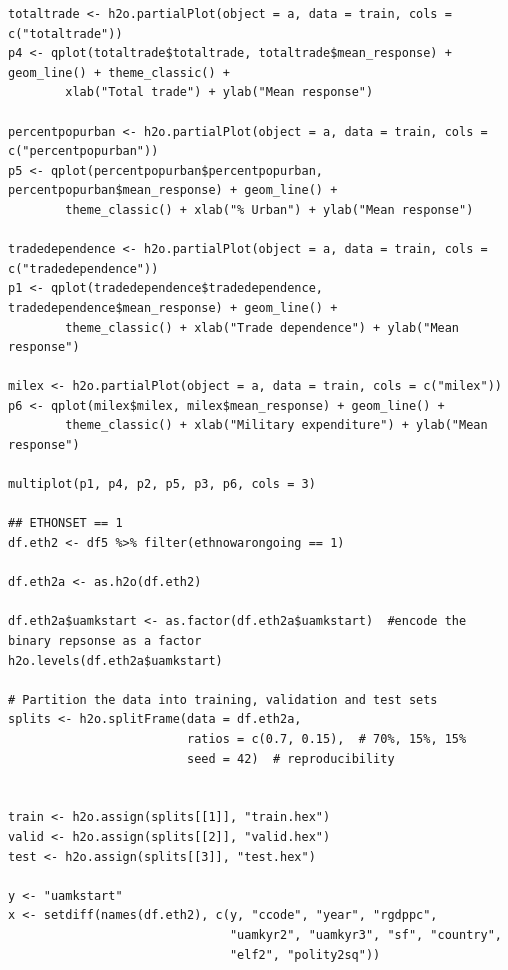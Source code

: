 \begin{verbatim}
totaltrade <- h2o.partialPlot(object = a, data = train, cols = c("totaltrade"))
p4 <- qplot(totaltrade$totaltrade, totaltrade$mean_response) + geom_line() + theme_classic() +
        xlab("Total trade") + ylab("Mean response")

percentpopurban <- h2o.partialPlot(object = a, data = train, cols = c("percentpopurban"))
p5 <- qplot(percentpopurban$percentpopurban, percentpopurban$mean_response) + geom_line() +
        theme_classic() + xlab("% Urban") + ylab("Mean response")

tradedependence <- h2o.partialPlot(object = a, data = train, cols = c("tradedependence"))
p1 <- qplot(tradedependence$tradedependence, tradedependence$mean_response) + geom_line() +
        theme_classic() + xlab("Trade dependence") + ylab("Mean response")

milex <- h2o.partialPlot(object = a, data = train, cols = c("milex"))
p6 <- qplot(milex$milex, milex$mean_response) + geom_line() +
        theme_classic() + xlab("Military expenditure") + ylab("Mean response")

multiplot(p1, p4, p2, p5, p3, p6, cols = 3)

## ETHONSET == 1
df.eth2 <- df5 %>% filter(ethnowarongoing == 1)

df.eth2a <- as.h2o(df.eth2)

df.eth2a$uamkstart <- as.factor(df.eth2a$uamkstart)  #encode the binary repsonse as a factor
h2o.levels(df.eth2a$uamkstart)

# Partition the data into training, validation and test sets
splits <- h2o.splitFrame(data = df.eth2a, 
                         ratios = c(0.7, 0.15),  # 70%, 15%, 15%
                         seed = 42)  # reproducibility


train <- h2o.assign(splits[[1]], "train.hex")   
valid <- h2o.assign(splits[[2]], "valid.hex") 
test <- h2o.assign(splits[[3]], "test.hex")

y <- "uamkstart"
x <- setdiff(names(df.eth2), c(y, "ccode", "year", "rgdppc",
                               "uamkyr2", "uamkyr3", "sf", "country",
                               "elf2", "polity2sq")) 


\end{verbatim}
